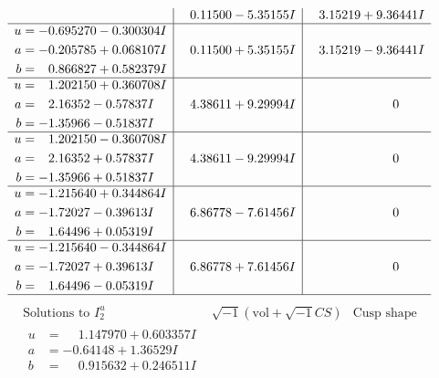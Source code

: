\documentclass[1p]{elsarticle_modified}
\theoremstyle{definition}
\newcommand{\I}{\sqrt{-1}}
\begin{document}
$$\begin{array}{c|c|c}
 & \phantom{-}0.11500 - 5.35155 I & \phantom{-}3.15219 + 9.36441 I \\ \hline\begin{aligned}
u &= -0.695270 - 0.300304 I \\
a &= -0.205785 + 0.068107 I \\
b &= \phantom{-}0.866827 + 0.582379 I\end{aligned}
 & \phantom{-}0.11500 + 5.35155 I & \phantom{-}3.15219 - 9.36441 I \\ \hline\begin{aligned}
u &= \phantom{-}1.202150 + 0.360708 I \\
a &= \phantom{-}2.16352 - 0.57837 I \\
b &= -1.35966 - 0.51837 I\end{aligned}
 & \phantom{-}4.38611 + 9.29994 I & \phantom{-0.000000 } 0 \\ \hline\begin{aligned}
u &= \phantom{-}1.202150 - 0.360708 I \\
a &= \phantom{-}2.16352 + 0.57837 I \\
b &= -1.35966 + 0.51837 I\end{aligned}
 & \phantom{-}4.38611 - 9.29994 I & \phantom{-0.000000 } 0 \\ \hline\begin{aligned}
u &= -1.215640 + 0.344864 I \\
a &= -1.72027 - 0.39613 I \\
b &= \phantom{-}1.64496 + 0.05319 I\end{aligned}
 & \phantom{-}6.86778 - 7.61456 I & \phantom{-0.000000 } 0 \\ \hline\begin{aligned}
u &= -1.215640 - 0.344864 I \\
a &= -1.72027 + 0.39613 I \\
b &= \phantom{-}1.64496 - 0.05319 I\end{aligned}
 & \phantom{-}6.86778 + 7.61456 I & \phantom{-0.000000 } 0\\
 \hline 
 \end{array}$$\newpage$$\begin{array}{c|c|c}  
\text{Solutions to }I^u_{2}& \I (\text{vol} + \sqrt{-1}CS) & \text{Cusp shape}\\
 \hline 
\begin{aligned}
u &= \phantom{-}1.147970 + 0.603357 I \\
a &= -0.64148 + 1.36529 I \\
b &= \phantom{-}0.915632 + 0.246511 I\end{aligned}

\end{array}$$
\end{document}

